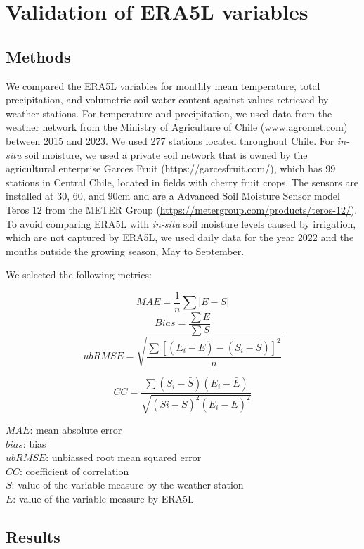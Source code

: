 \documentclass[
  authoryear,
  preprint,
  3p,
  onecolumn]{elsarticle}
\begin{document}
\section{Validation of ERA5L
variables}\label{validation-of-era5l-variables}

\subsection{Methods}\label{methods}

We compared the ERA5L \citep{MunozSabater2021} variables for monthly
mean temperature, total precipitation, and volumetric soil water content
against values retrieved by weather stations. For temperature and
precipitation, we used data from the weather network from the Ministry
of Agriculture of Chile (www.agromet.com) between 2015 and 2023. We used
277 stations located throughout Chile. For \emph{in-situ} soil moisture,
we used a private soil network that is owned by the agricultural
enterprise Garces Fruit (https://garcesfruit.com/), which has 99
stations in Central Chile, located in fields with cherry fruit crops.
The sensors are installed at 30, 60, and 90cm and are a Advanced Soil
Moisture Sensor model Teros 12 from the METER Group
(\url{https://metergroup.com/products/teros-12/}). To avoid comparing
ERA5L with \emph{in-situ} soil moisture levels caused by irrigation,
which are not captured by ERA5L, we used daily data for the year 2022
and the months outside the growing season, May to September.

We selected the following metrics:

\[MAE = \frac{1}{n}\sum |{E-S}|\] \[Bias = \frac{\sum E}{\sum S}\]
\[ubRMSE =\sqrt{\frac{\sum{ \left[ (E_i-\overline{E})-(S_i-\overline{S}) \right ] ^2}}{n}}\]

\[CC = \frac{\sum (S_i-\bar{S})(E_i-\bar{E})}{\sqrt{(Si-\bar{S})^2(E_i-\bar{E})^2}}\]

\(MAE\): mean absolute error\\
\(bias\): bias\\
\(ubRMSE\): unbiassed root mean squared error\\
\(CC\): coefficient of correlation\\
\(S\): value of the variable measure by the weather station\\
\(E\): value of the variable measure by ERA5L

\subsection{Results}\label{results}
\end{document}
